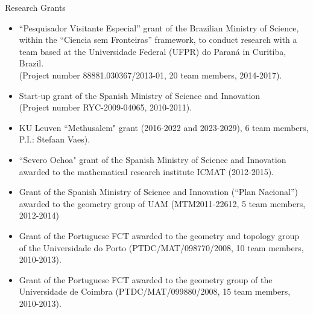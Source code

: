 \documentclass[12p]{resume}
\begin{document}
\begin{category}{Research Grants}
\begin{itemize}
 
 
\item ``Pesquisador Visitante Especial'' grant of the Brazilian Ministry of Science, within the ``Ciencia sem Fronteiras'' framework, to conduct research with a team based at the 
Universidade Federal (UFPR) do Paran\'a in Curitiba, Brazil. 
 \\
(Project number 88881.030367/2013-01, 20 team members, 2014-2017).

\item Start-up grant  of the Spanish Ministry of Science and Innovation\\
 (Project number RYC-2009-04065, 2010-2011).
\end{itemize}


\begin{itemize}

\item
KU Leuven ``Methusalem" grant (2016-2022 and 2023-2029), 6 team members, P.I.: Stefaan Vaes).




\item
``Severo Ochoa" grant  of the Spanish  Ministry of Science and Innovation    awarded to the mathematical research institute ICMAT (2012-2015).


\item
 Grant  of the Spanish  Ministry of Science and Innovation (``Plan Nacional'')  awarded to the geometry  group of UAM (MTM2011-22612, 5 team members, 2012-2014)


\item
 Grant  of the Portuguese FCT awarded to the geometry and topology group of the Universidade do Porto (PTDC/MAT/098770/2008, 10 team members, 2010-2013).

\item Grant  of the Portuguese FCT awarded to the geometry   group of the Universidade de Coimbra (PTDC/MAT/099880/2008, 15 team members, 2010-2013).


\end{itemize}
\end{category}
\end{document}
